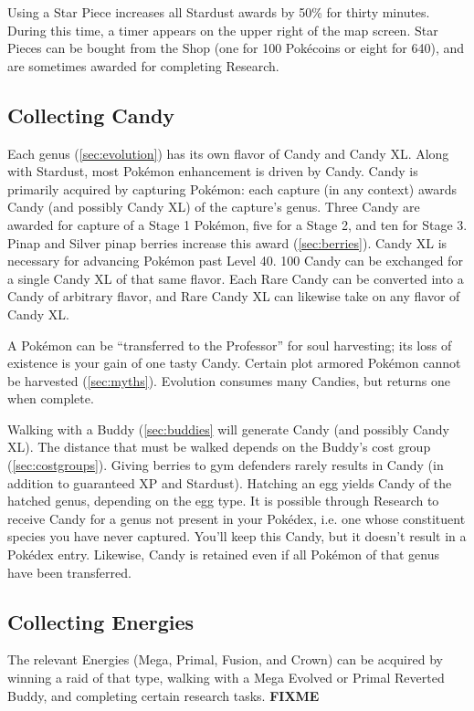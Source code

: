 Using a Star Piece increases all Stardust awards by 50\% for thirty minutes.
During this time, a timer appears on the upper right of the map screen.
Star Pieces can be bought from the Shop (one for 100 Pokécoins or eight for 640),
  and are sometimes awarded for completing Research.

\subsection{Collecting Candy}
\label{subsec:getcandy}
Each genus (\autoref{sec:evolution}) has its own flavor of Candy and Candy XL.
Along with Stardust, most Pokémon enhancement is driven by Candy.
Candy is primarily acquired by capturing Pokémon: each capture (in any context)
  awards Candy (and possibly Candy XL) of the capture's genus.
Three Candy are awarded for capture of a Stage 1 Pokémon, five for a Stage 2,
  and ten for Stage 3.
Pinap and Silver pinap berries increase this award (\autoref{sec:berries}).
Candy XL is necessary for advancing Pokémon past Level 40.
100 Candy can be exchanged for a single Candy XL of that same flavor.
Each Rare Candy can be converted into a Candy of arbitrary flavor, and Rare Candy XL
  can likewise take on any flavor of Candy XL.

A Pokémon can be ``transferred to the Professor'' for soul harvesting;
  its loss of existence is your gain of one tasty Candy.
Certain plot armored Pokémon cannot be harvested (\autoref{sec:myths}).
Evolution consumes many Candies, but returns one when complete.

Walking with a Buddy (\autoref{sec:buddies} will generate Candy (and possibly Candy XL).
The distance that must be walked depends on the Buddy's cost group (\autoref{sec:costgroups}).
Giving berries to gym defenders rarely results in Candy (in addition to guaranteed XP and Stardust).
Hatching an egg yields Candy of the hatched genus, depending on the egg type.
It is possible through Research to receive Candy for a genus not present in
  your Pokédex, i.e. one whose constituent species you have never captured.
You'll keep this Candy, but it doesn't result in a Pokédex entry.
Likewise, Candy is retained even if all Pokémon of that genus have been transferred.
\subsection{Collecting Energies}
The relevant Energies (Mega, Primal, Fusion, and Crown) can be acquired by winning a raid of that type,
  walking with a Mega Evolved or Primal Reverted Buddy, and completing
  certain research tasks.
\textbf{FIXME}

